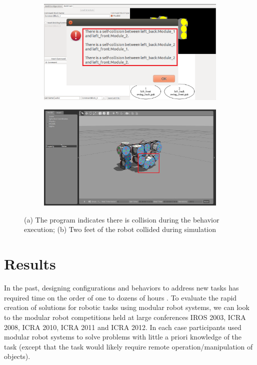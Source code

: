 \documentclass[conference]{IEEEtran}
\theoremstyle{definition}
\begin{document}
\begin{figure}
\begin{center}
        \begin{subfigure}[b]{0.48\columnwidth}
                \includegraphics[width=\textwidth]{images/designer_gait_collision.png}
                \caption{}
                \label{fig:gait_collision}
           \end{subfigure}
        \begin{subfigure}[b]{0.48\columnwidth}
                \includegraphics[width=\textwidth]{images/gazebo_gait_collision.png}
                \caption{}
                \label{fig:gait_collision2}
        \end{subfigure}
\end{center}
\caption{(a) The program indicates there is collision during the behavior execution; (b) Two feet of  the robot collided during simulation}
\label{fig:gait_unstable}
\end{figure}


\section{Results}
In the past, designing configurations and behaviors to address new tasks has required
time on the order of one to dozens of hours \cite{sastra2011using}.  To evaluate the rapid creation of solutions for robotic tasks using modular robot systems, we can look to the modular robot competitions held at large conferences IROS 2003, ICRA 2008, ICRA 2010, ICRA 2011 and ICRA 2012. In each case participants used modular robot systems to solve problems with little a priori knowledge of the task (except that the task would likely require remote operation/manipulation of objects).
\end{document}
